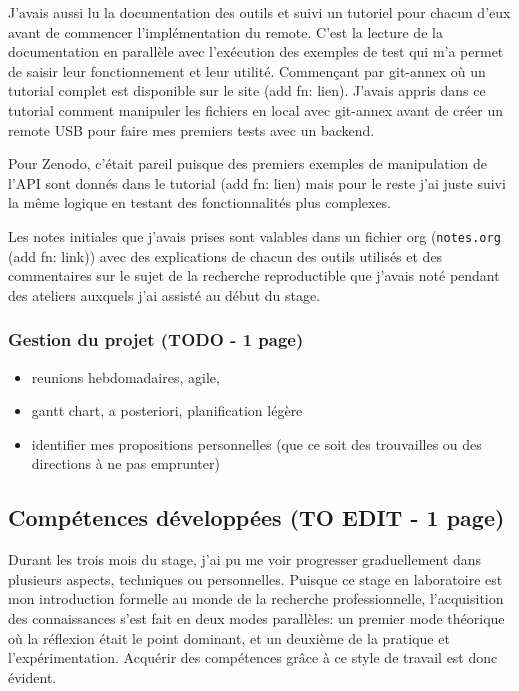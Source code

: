 \documentclass[11pt]{article}
\begin{document}
J'avais aussi lu la documentation des outils et suivi un tutoriel pour
chacun d'eux avant de commencer l'implémentation du remote. C'est la
lecture de la documentation en parallèle avec l'exécution des exemples
de test qui m'a permet de saisir leur fonctionnement et leur utilité.
Commençant par git-annex où un tutorial complet est disponible sur le
site (add fn: lien). J'avais appris dans ce tutorial comment
manipuler les fichiers en local avec git-annex avant de créer un
remote USB pour faire mes premiers tests avec un backend.

Pour Zenodo, c'était pareil puisque des premiers exemples de
manipulation de l'API sont donnés dans le tutorial (add fn: lien)
mais pour le reste j'ai juste suivi la même logique en testant des
fonctionnalités plus complexes.

Les notes initiales que j'avais prises sont valables dans un fichier
org (\texttt{notes.org} (add fn: link)) avec des explications de chacun des outils utilisés et des
commentaires sur le sujet de la recherche reproductible que j'avais
noté pendant des ateliers auxquels j'ai assisté au début du stage. 

\subsubsection{Gestion du projet (TODO - 1 page)}
\label{sec:org46a805f}
\begin{itemize}
\item reunions hebdomadaires, agile,
\item gantt chart, a posteriori, planification légère
\item identifier mes propositions personnelles (que ce soit des
trouvailles ou des directions à ne pas emprunter)
\end{itemize}
\subsection{Compétences développées (TO EDIT - 1 page)}
\label{sec:orgf2e7103}
Durant les trois mois du stage, j'ai pu me voir progresser
graduellement dans plusieurs aspects, techniques ou
personnelles. Puisque ce stage en laboratoire est mon introduction
formelle au monde de la recherche professionnelle, l'acquisition des
connaissances s'est fait en deux modes parallèles: un premier mode
théorique où la réflexion était le point dominant, et un deuxième de
la pratique et l'expérimentation. Acquérir des compétences grâce à ce
style de travail est donc évident.
\end{document}
